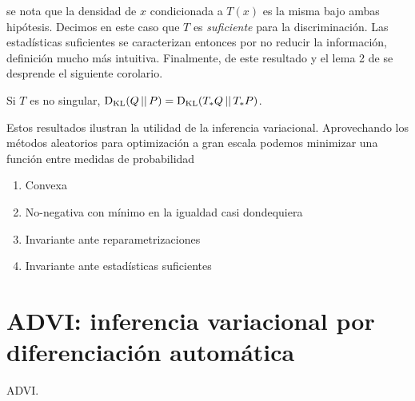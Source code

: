 \documentclass[main.tex]{subfiles}
\begin{document}
se nota que la densidad de $x$ condicionada a $T(x)$ es la misma bajo ambas hipótesis. Decimos en este caso que $T$ es \textit{suficiente} para la discriminación. Las estadísticas suficientes se caracterizan entonces por no reducir la información, definición mucho más intuitiva. Finalmente, de este resultado y el lema 2 de \cite{halmos1949} se desprende el siguiente corolario.

\begin{corollary}
	Si $T$ es no singular, $\operatorname*{D_{KL}}(Q \operatorname*{\mid\mid} P) = \operatorname*{D_{KL}}(T_*Q \operatorname*{\mid\mid} T_*P)$. 
\end{corollary}

Estos resultados ilustran la utilidad de la inferencia variacional. Aprovechando los métodos aleatorios para optimización a gran escala podemos minimizar una función entre medidas de probabilidad
\begin{enumerate}[label=\roman*.]
	\item Convexa
	\item No-negativa con mínimo en la igualdad casi dondequiera
	\item Invariante ante reparametrizaciones
	\item Invariante ante estadísticas suficientes
\end{enumerate}

\section{ADVI: inferencia variacional por diferenciación automática}
ADVI.
\end{document}
